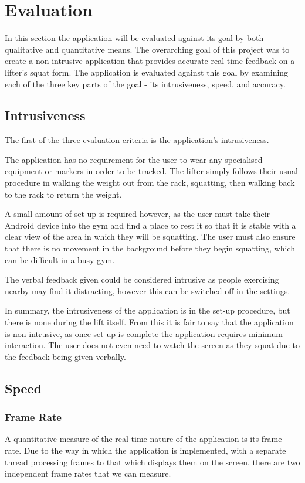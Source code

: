 \section{Evaluation}

In this section the application will be evaluated against its goal by both qualitative and quantitative means. The overarching goal of this project was to create a non-intrusive application that provides accurate real-time feedback on a lifter's squat form. The application is evaluated against this goal by examining each of the three key parts of the goal - its intrusiveness, speed, and accuracy.

\subsection{Intrusiveness}
The first of the three evaluation criteria is the application's intrusiveness. 

The application has no requirement for the user to wear any specialised equipment or markers in order to be tracked. The lifter simply follows their usual procedure in walking the weight out from the rack, squatting, then walking back to the rack to return the weight.

A small amount of set-up is required however, as the user must take their Android device into the gym and find a place to rest it so that it is stable with a clear view of the area in which they will be squatting. The user must also ensure that there is no movement in the background before they begin squatting, which can be difficult in a busy gym.

The verbal feedback given could be considered intrusive as people exercising nearby may find it distracting, however this can be switched off in the settings.

In summary, the intrusiveness of the application is in the set-up procedure, but there is none during the lift itself. From this it is fair to say that the application is non-intrusive, as once set-up is complete the application requires minimum interaction. The user does not even need to watch the screen as they squat due to the feedback being given verbally.

\subsection{Speed}

\subsubsection{Frame Rate}
A quantitative measure of the real-time nature of the application is its frame rate. Due to the way in which the application is implemented, with a separate thread processing frames to that which displays them on the screen, there are two independent frame rates that we can measure.

